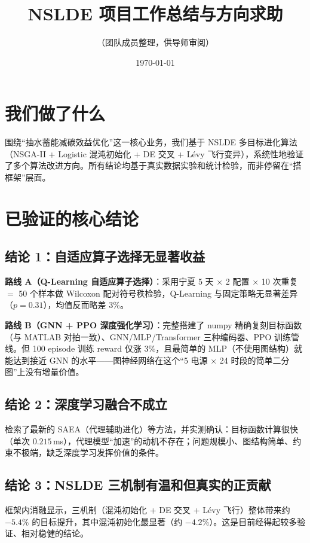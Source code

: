 \documentclass[11pt,a4paper]{ctexart}
\title{\textbf{NSLDE 项目工作总结与方向求助}}
\author{（团队成员整理，供导师审阅）}
\date{\today}
\begin{document}
\maketitle
\vspace{-2em}

\section{我们做了什么}

围绕``抽水蓄能减碳效益优化''这一核心业务，我们基于 NSLDE 多目标进化算法（NSGA-II + Logistic 混沌初始化 + DE 交叉 + Lévy 飞行变异），系统性地验证了多个算法改进方向。所有结论均基于真实数据实验和统计检验，而非停留在``搭框架''层面。

\section{已验证的核心结论}

\subsection{结论 1：自适应算子选择无显著收益}

\textbf{路线 A（Q-Learning 自适应算子选择）}：采用宁夏 5 天 $\times$ 2 配置 $\times$ 10 次重复 $=$ 50 个样本做 Wilcoxon 配对符号秩检验，Q-Learning 与固定策略无显著差异（$p = 0.31$），均值反而略差 $3\%$。

\textbf{路线 B（GNN + PPO 深度强化学习）}：完整搭建了 numpy 精确复刻目标函数（与 MATLAB 对拍一致）、GNN/MLP/Transformer 三种编码器、PPO 训练管线。但 100 episode 训练 reward 仅涨 $3\%$，且最简单的 MLP（不使用图结构）就能达到接近 GNN 的水平——图神经网络在这个``5 电源 $\times$ 24 时段的简单二分图''上没有增量价值。

\subsection{结论 2：深度学习融合不成立}

检索了最新的 SAEA（代理辅助进化）等方法，并实测确认：目标函数计算很快（单次 $0.215$\,ms），代理模型``加速''的动机不存在；问题规模小、图结构简单、约束不极端，缺乏深度学习发挥价值的条件。

\subsection{结论 3：NSLDE 三机制有温和但真实的正贡献}

框架内消融显示，三机制（混沌初始化 + DE 交叉 + Lévy 飞行）整体带来约 $-5.4\%$ 的目标提升，其中混沌初始化最显著（约 $-4.2\%$）。这是目前经得起较多验证、相对稳健的结论。
\end{document}
